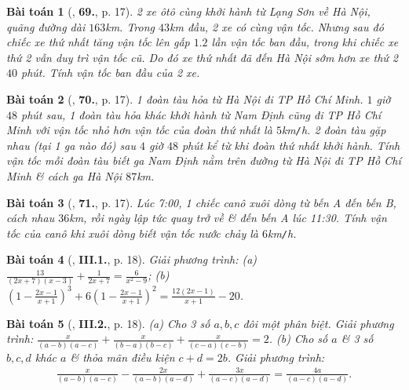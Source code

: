 \documentclass{article}
\numberwithin{equation}{section}
\newtheorem{baitoan}{Bài toán}
\begin{document}
\begin{baitoan}[\cite{SBT_Toan_8_tap_2}, \textbf{69.}, p. 17]
	2 xe ôtô cùng khởi hành từ Lạng Sơn về Hà Nội, quãng đường dài $163$\emph{km}. Trong $43$\emph{km} đầu, 2 xe có cùng vận tốc. Nhưng sau đó chiếc xe thứ nhất tăng vận tốc lên gấp $1.2$ lần vận tốc ban đầu, trong khi chiếc xe thứ 2 vẫn duy trì vận tốc cũ. Do đó xe thứ nhất đã đến Hà Nội sớm hơn xe thứ 2 $40$ phút. Tính vận tốc ban đầu của 2 xe.
\end{baitoan}

\begin{baitoan}[\cite{SBT_Toan_8_tap_2}, \textbf{70.}, p. 17]
	1 đoàn tàu hỏa từ Hà Nội đi TP Hồ Chí Minh. $1$ giờ $48$ phút sau, 1 đoàn tàu hỏa khác khởi hành từ Nam Định cũng đi TP Hồ Chí Minh với vận tốc nhỏ hơn vận tốc của đoàn thứ nhất là $5$\emph{km\texttt{/}h}. 2 đoàn tàu gặp nhau (tại 1 ga nào đó) sau $4$ giờ $48$ phút kể từ khi đoàn thứ nhất khởi hành. Tính vận tốc mỗi đoàn tàu biết ga Nam Định nằm trên đường từ Hà Nội đi TP Hồ Chí Minh \& cách ga Hà Nội $87$\emph{km}.
\end{baitoan}

\begin{baitoan}[\cite{SBT_Toan_8_tap_2}, \textbf{71.}, p. 17]
	Lúc 7:00, 1 chiếc canô xuôi dòng từ bến A đến bến B, cách nhau  $36$\emph{km}, rồi ngày lập tức quay trở về \& đến bến A lúc 11:30. Tính vận tốc của canô khi xuôi dòng biết vận tốc nước chảy là $6$\emph{km\texttt{/}h}.
\end{baitoan}

\begin{baitoan}[\cite{SBT_Toan_8_tap_2}, \textbf{III.1.}, p. 18]
	Giải phương trình: (a) $\frac{13}{(2x + 7)(x - 3)} + \frac{1}{2x + 7} = \frac{6}{x^2 - 9}$; (b) $\left(1 - \frac{2x - 1}{x + 1}\right)^3 + 6\left(1 - \frac{2x - 1}{x + 1}\right)^2 = \frac{12(2x - 1)}{x + 1} - 20$.
\end{baitoan}

\begin{baitoan}[\cite{SBT_Toan_8_tap_2}, \textbf{III.2.}, p. 18]
	(a) Cho 3 số $a,b,c$ đôi một phân biệt. Giải phương trình: $\frac{x}{(a - b)(a - c)} + \frac{x}{(b - a)(b - c)} + \frac{x}{(c - a)(c - b)} = 2$. (b) Cho số $a$ \& 3 số $b,c,d$ khác $a$ \& thỏa mãn điều kiện $c + d = 2b$. Giải phương trình:
	\begin{align*}
		\frac{x}{(a - b)(a - c)} - \frac{2x}{(a - b)(a - d)} + \frac{3x}{(a - c)(a - d)} = \frac{4a}{(a - c)(a - d)}.
	\end{align*}
\end{baitoan}
\end{document}
